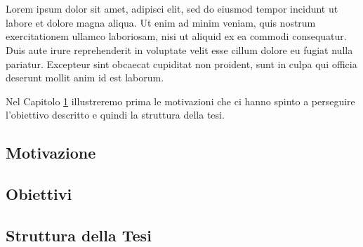 \chapter{}
\label{chap:1-introduction}

Lorem ipsum dolor sit amet,  adipisci elit, sed do eiusmod tempor incidunt ut labore et dolore magna aliqua. Ut enim ad minim veniam, quis nostrum exercitationem ullamco laboriosam, nisi ut aliquid ex ea commodi consequatur. Duis aute irure reprehenderit in voluptate velit esse cillum dolore eu fugiat nulla pariatur. Excepteur sint obcaecat cupiditat non proident, sunt in culpa qui officia deserunt mollit anim id est laborum.

Nel Capitolo \ref{chap:1-introduction} illustreremo prima le motivazioni che ci hanno spinto a perseguire l'obiettivo descritto e quindi la struttura della tesi.

\section{Motivazione}
\section{Obiettivi}
\section{Struttura della Tesi}
